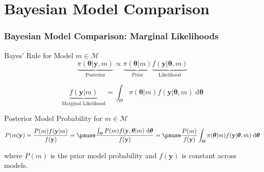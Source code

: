 \section{Bayesian Model Comparison}
\begin{frame}
  \frametitle{Bayesian Model Comparison: Marginal Likelihoods}



  \begin{block}{Bayes' Rule for Model $m\in\mathcal{M}$}
    \footnotesize
    \vspace{-1em}
  \[
    \underbrace{\pi(\boldsymbol{\theta}|\mathbf{y},m)}_{\text{Posterior}} \propto \underbrace{\pi(\boldsymbol{\theta}|m)}_{\text{Prior}}\underbrace{ f(\mathbf{y}|\boldsymbol{\theta},m)}_{\text{Likelihood}}
  \]

  \[
   \underbrace{f(\mathbf{y}|m)}_{\text{Marginal Likelihood}} = \int_\Theta \pi(\boldsymbol{\theta}|m)f(\mathbf{y}|\boldsymbol{\theta},m)\; \text{d}\boldsymbol{\theta}
  \]
  \end{block}

  \pause

  \begin{block}{Posterior Model Probability for $m \in \mathcal{M}$}
    \footnotesize
    \vspace{-1em}
   \[
     P(m|\mathbf{y}) = \frac{P(m)f(\mathbf{y}|m)}{f(\mathbf{y})} = \pause \frac{\int_\Theta P(m) f(\mathbf{y},\boldsymbol{\theta}|m)\;  \text{d}\boldsymbol{\theta}}{f(\mathbf{y})} = \pause \frac{P(m)}{f(\mathbf{y})} \int_\Theta \pi(\boldsymbol{\theta}|m)f(\mathbf{y}|\boldsymbol{\theta},m)\; \text{d}\boldsymbol{\theta} 
   \]

   where $P(m)$ is the \alert{prior model probability} and $f(\mathbf{y})$ is constant across models.
  \end{block}

\end{frame}
%
%
%
%
%

